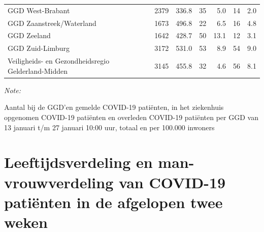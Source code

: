 \documentclass[
  english,
  man,floatsintext]{apa6}
\begin{document}
\begin{table}[H]
\begin{threeparttable}
\begin{tabular}{lrrrrrr}
GGD West-Brabant & 2379 & 336.8 & 35 & 5.0 & 14 & 2.0\\
GGD Zaanstreek/Waterland & 1673 & 496.8 & 22 & 6.5 & 16 & 4.8\\
GGD Zeeland & 1642 & 428.7 & 50 & 13.1 & 12 & 3.1\\
GGD Zuid-Limburg & 3172 & 531.0 & 53 & 8.9 & 54 & 9.0\\
Veiligheids- en Gezondheidsregio Gelderland-Midden & 3145 & 455.8 & 32 & 4.6 & 56 & 8.1\\
\bottomrule
\end{tabular}
\begin{tablenotes}
\item \textit{Note: } 
\item Aantal bij de GGD’en gemelde COVID-19 patiënten, in het ziekenhuis opgenomen COVID-19 patiënten en overleden COVID-19 patiënten per GGD van 13 januari t/m 27 januari 10:00 uur, totaal en per 100.000 inwoners
\end{tablenotes}
\end{threeparttable}
\endgroup{}
\end{table}

\newpage

\hypertarget{leeftijdsverdeling-en-man-vrouwverdeling-van-covid-19-patiuxebnten-in-de-afgelopen-twee-weken}{%
\section{Leeftijdsverdeling en man-vrouwverdeling van COVID-19 patiënten in de afgelopen twee weken}\label{leeftijdsverdeling-en-man-vrouwverdeling-van-covid-19-patiuxebnten-in-de-afgelopen-twee-weken}}
\end{document}
